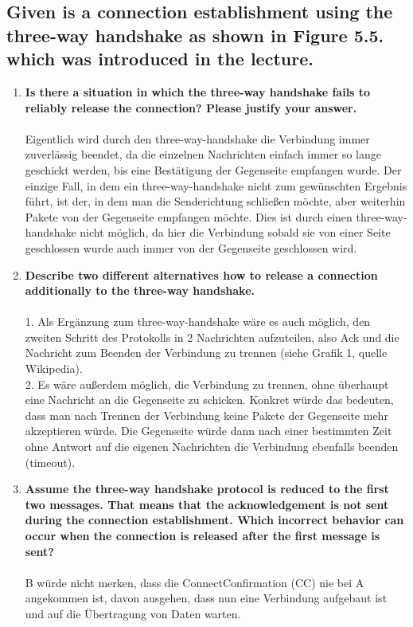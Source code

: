 \documentclass[a4paper,
			llpt,
			solution,
			accentcolor=tud2d,
			colorbacktitle
			]
			{tudexercise}
\begin{document}
\subsection{Given is a connection establishment using the three-way handshake as shown in Figure 5.5. which was introduced in the lecture.}
\begin{enumerate}
\item \textbf{Is there a situation in which the three-way handshake fails to reliably release the connection?
Please justify your answer.}\\
\\
Eigentlich wird durch den three-way-handshake die Verbindung immer zuverlässig beendet, da die einzelnen Nachrichten einfach immer so lange geschickt werden, bis eine Bestätigung der Gegenseite empfangen wurde.
Der einzige Fall, in dem ein three-way-handshake nicht zum gewünschten Ergebnis führt, ist der, in dem man die Senderichtung schließen möchte, aber weiterhin Pakete von der Gegenseite empfangen möchte. Dies ist durch einen three-way-handshake nicht möglich, da hier die Verbindung sobald sie von einer Seite geschlossen wurde auch immer von der Gegenseite geschlossen wird.
\item \textbf{Describe two different alternatives how to release a connection additionally to the three-way
handshake.}\\
\\
1. Als Ergänzung zum three-way-handshake wäre es auch möglich, den zweiten Schritt des Protokolls in 2 Nachrichten aufzuteilen, also Ack und die Nachricht zum Beenden der Verbindung zu trennen (siehe Grafik 1, quelle Wikipedia).\\
2. Es wäre außerdem möglich, die Verbindung zu trennen, ohne überhaupt eine Nachricht an die Gegenseite zu schicken. Konkret würde das bedeuten, dass man nach Trennen der Verbindung keine Pakete der Gegenseite mehr akzeptieren würde. Die Gegenseite würde dann nach einer bestimmten Zeit ohne Antwort auf die eigenen Nachrichten die Verbindung ebenfalls beenden (timeout).
\item \textbf{Assume the three-way handshake protocol is reduced to the first two messages. That means
that the acknowledgement is not sent during the connection establishment. Which incorrect
behavior can occur when the connection is released after the first message is sent?}\\
\\
B würde nicht merken, dass die ConnectConfirmation (CC) nie bei A angekommen ist, davon ausgehen, dass nun eine Verbindung aufgebaut ist und auf die Übertragung von Daten warten.
\end{enumerate}
\end{document}
